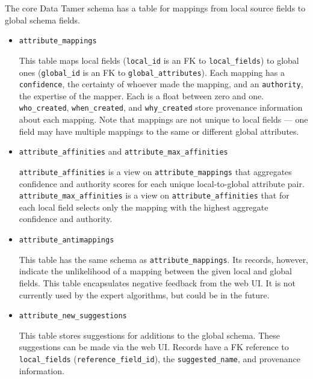The core Data Tamer schema has a table for mappings from local source fields to global schema fields.

\begin{itemize}

\item \texttt{attribute\_mappings}

This table maps local fields (\texttt{local\_id} is an FK to \texttt{local\_fields}) to global ones (\texttt{global\_id} is an FK to \texttt{global\_attributes}).  Each mapping has a \texttt{confidence}, the certainty of whoever made the mapping, and an \texttt{authority}, the expertise of the mapper.  Each is a float between zero and one.  \texttt{who\_created}, \texttt{when\_created}, and \texttt{why\_created} store provenance information about each mapping.  Note that mappings are not unique to local fields --- one field may have multiple mappings to the same or different global attributes.

\item \texttt{attribute\_affinities} and \texttt{attribute\_max\_affinities}

\texttt{attribute\_affinities} is a view on \texttt{attribute\_mappings} that aggregates confidence and authority scores for each unique local-to-global attribute pair.  \texttt{attribute\_max\_affinities} is a view on \texttt{attribute\_affinities} that for each local field selects only the mapping with the highest aggregate confidence and authority.

\item \texttt{attribute\_antimappings}

This table has the same schema as \texttt{attribute\_mappings}.  Its records, however, indicate the unlikelihood of a mapping between the given local and global fields.  This table encapsulates negative feedback from the web UI.  It is not currently used by the expert algorithms, but could be in the future.

\item \texttt{attribute\_new\_suggestions}

This table stores suggestions for additions to the global schema.  These suggestions can be made via the web UI.  Records have a FK reference to \texttt{local\_fields} (\texttt{reference\_field\_id}), the \texttt{suggested\_name}, and provenance information.

\end{itemize}



